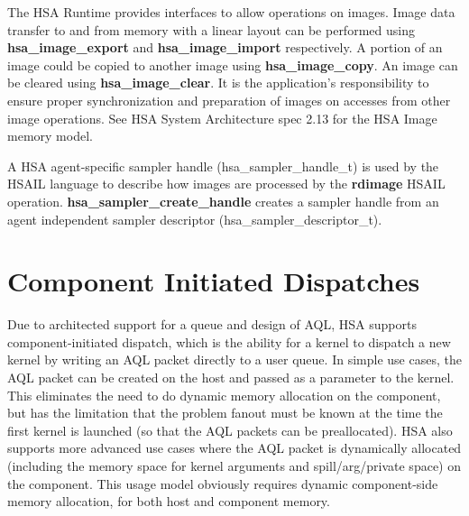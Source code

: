 \documentclass[final]{book}
\newcommand{\reffun}[1]{\textbf{#1}}
\newcommand{\reftyp}[1]{#1}
\newcommand{\refhsl}[1]{\reffun{#1}}
\begin{document}
The HSA Runtime provides interfaces to allow operations on images. Image data
transfer to and from memory with a linear layout can be performed using
\reffun{hsa_image_export} and \reffun{hsa_image_import} respectively. A
portion of an image could be copied to another image using
\reffun{hsa_image_copy}. An image can be cleared using
\reffun{hsa_image_clear}. It is the application's responsibility to ensure
proper synchronization and preparation of images on accesses from other image
operations. See HSA System Architecture spec 2.13 for the HSA Image memory
model.

A HSA agent-specific sampler handle (\reftyp{hsa_sampler_handle_t}) is used by
the HSAIL language to describe how images are processed by the \refhsl{rdimage}
HSAIL operation. \reffun{hsa_sampler_create_handle} creates a sampler handle
from an agent independent sampler descriptor
(\reftyp{hsa_sampler_descriptor_t}).

\section{Component Initiated Dispatches} \label{architected}
\hypertarget{architectedchptr}{}

Due to architected support for a queue and design of AQL, HSA supports
component-initiated dispatch, which is the ability for a kernel to dispatch a
new kernel by writing an AQL packet directly to a user queue. In simple use
cases, the AQL packet can be created on the host and passed as a parameter to
the kernel. This eliminates the need to do dynamic memory allocation on the
component, but has the limitation that the problem fanout must be known at the
time the first kernel is launched (so that the AQL packets can be
preallocated). HSA also supports more advanced use cases where the AQL packet is
dynamically allocated (including the memory space for kernel arguments and
spill/arg/private space) on the component. This usage model obviously requires
dynamic component-side memory allocation, for both host and component memory.
\end{document}
